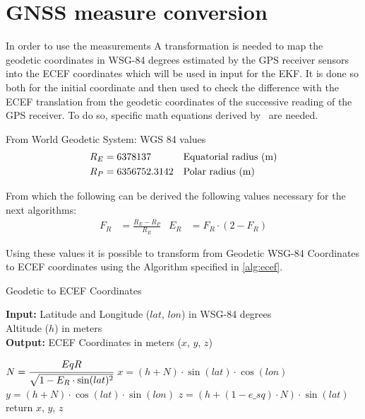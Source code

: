 \chapter{GNSS measure conversion}
\label{ch:conv-gnss}
\noindent

\noindent
In order to use the measurements 
A transformation is needed to map the geodetic coordinates in WSG-84 degrees estimated by the GPS receiver sensors into the ECEF coordinates which will be used in input for the \gls{EKF}. 
It is done so both for the initial coordinate and then used to check the difference with the ECEF translation from the geodetic coordinates of the successive reading of the GPS receiver.
To do so, specific math equations derived by~\cite{Vincenty} are needed. 



From World Geodetic System: WGS 84 values
\begin{align}
    R_E &= 6378137 && \text{Equatorial radius (\SI{}{\meter})} \\
    R_P &= 6356752.3142 && \text{Polar radius (\SI{}{\meter})}
\end{align}

From which the following can be derived the following values necessary for the next algorithms:
\begin{align}
    F_R &= \frac{R_E - R_P}{R_E} &
    E_R &= F_R \cdot (2-F_R)
\end{align}

Using these values it is possible to transform from Geodetic WSG-84 Coordinates to ECEF coordinates using the  Algorithm specified in \ref{alg:ecef}.


\begin{algorithm}[ht!]
\caption{Geodetic to ECEF Coordinates }
\label{alg:ecef}
  \hspace*{\algorithmicindent} \textbf{Input:} Latitude and Longitude ($lat$, $lon$) in WSG-84 degrees\\
  \hspace*{4em} Altitude ($h$) in meters\\
  \hspace*{\algorithmicindent} \textbf{Output:} ECEF Coordinates in meters ($x$, $y$, $z$)
  \begin{algorithmic}[1]
  \STATE $N = \cfrac{EqR}{\sqrt{1 - E_R \cdot \sin(lat)^2}}$
  \STATE $x = (h + N) \cdot \sin(lat) \cdot \cos(lon)$
  \STATE $y = (h + N) \cdot \cos(lat) \cdot \sin(lon)$
  \STATE $z = (h + (1 - e\_sq) \cdot N) \cdot \sin(lat)$
  \STATE return $x$, $y$, $z$
    \end{algorithmic}
\end{algorithm}

